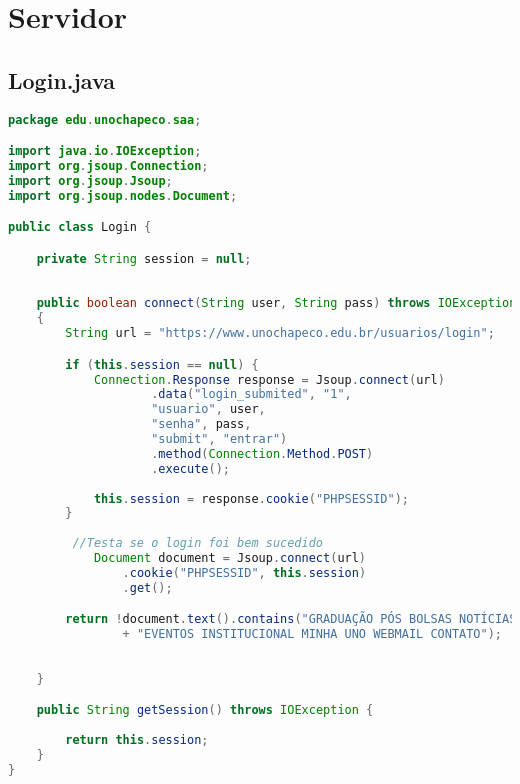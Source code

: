 \chapter{Servidor}

\section{Login.java}
\begin{lstlisting}[language=java, frame=single]
package edu.unochapeco.saa;

import java.io.IOException;
import org.jsoup.Connection;
import org.jsoup.Jsoup;
import org.jsoup.nodes.Document;

public class Login {

    private String session = null;
    
    
    public boolean connect(String user, String pass) throws IOException 
    {
        String url = "https://www.unochapeco.edu.br/usuarios/login";

        if (this.session == null) {
            Connection.Response response = Jsoup.connect(url)
                    .data("login_submited", "1",
                    "usuario", user,
                    "senha", pass,
                    "submit", "entrar")
                    .method(Connection.Method.POST)
                    .execute();
            
            this.session = response.cookie("PHPSESSID");
        }
        
         //Testa se o login foi bem sucedido
            Document document = Jsoup.connect(url)
                .cookie("PHPSESSID", this.session)
                .get();

        return !document.text().contains("GRADUAÇÃO PÓS BOLSAS NOTÍCIAS UNOWEBTV "
                + "EVENTOS INSTITUCIONAL MINHA UNO WEBMAIL CONTATO");
        
        
    }

    public String getSession() throws IOException {
        
        return this.session;
    }
}
\end{lstlisting}

